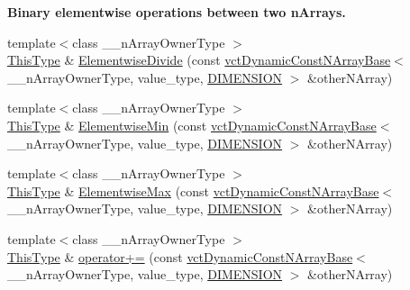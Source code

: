 \begin{Indent}{\bf Binary elementwise operations between two n\-Arrays.}
\begin{DoxyCompactItemize}
\item 
{\footnotesize template$<$class \-\_\-\-\_\-n\-Array\-Owner\-Type $>$ }\\\hyperlink{classvct_dynamic_const_n_array_base_a5123caffcf1455a1b99003877eade897}{This\-Type} \& \hyperlink{classvct_dynamic_n_array_base_ad8c7aae1f9f3e6a062e83219d1878f8f}{Elementwise\-Divide} (const \hyperlink{classvct_dynamic_const_n_array_base}{vct\-Dynamic\-Const\-N\-Array\-Base}$<$ \-\_\-\-\_\-n\-Array\-Owner\-Type, value\-\_\-type, \hyperlink{classvct_dynamic_n_array_base_aa66532d28588bdf26d08fb593db815d6abfcde386ec801b212d7c42d63a4f3837}{D\-I\-M\-E\-N\-S\-I\-O\-N} $>$ \&other\-N\-Array)
\item 
{\footnotesize template$<$class \-\_\-\-\_\-n\-Array\-Owner\-Type $>$ }\\\hyperlink{classvct_dynamic_const_n_array_base_a5123caffcf1455a1b99003877eade897}{This\-Type} \& \hyperlink{classvct_dynamic_n_array_base_a85e6f5675786bb1c81768d2d71a779ba}{Elementwise\-Min} (const \hyperlink{classvct_dynamic_const_n_array_base}{vct\-Dynamic\-Const\-N\-Array\-Base}$<$ \-\_\-\-\_\-n\-Array\-Owner\-Type, value\-\_\-type, \hyperlink{classvct_dynamic_n_array_base_aa66532d28588bdf26d08fb593db815d6abfcde386ec801b212d7c42d63a4f3837}{D\-I\-M\-E\-N\-S\-I\-O\-N} $>$ \&other\-N\-Array)
\item 
{\footnotesize template$<$class \-\_\-\-\_\-n\-Array\-Owner\-Type $>$ }\\\hyperlink{classvct_dynamic_const_n_array_base_a5123caffcf1455a1b99003877eade897}{This\-Type} \& \hyperlink{classvct_dynamic_n_array_base_a710b76f005b3bf51fa907cb8040232d3}{Elementwise\-Max} (const \hyperlink{classvct_dynamic_const_n_array_base}{vct\-Dynamic\-Const\-N\-Array\-Base}$<$ \-\_\-\-\_\-n\-Array\-Owner\-Type, value\-\_\-type, \hyperlink{classvct_dynamic_n_array_base_aa66532d28588bdf26d08fb593db815d6abfcde386ec801b212d7c42d63a4f3837}{D\-I\-M\-E\-N\-S\-I\-O\-N} $>$ \&other\-N\-Array)
\item 
{\footnotesize template$<$class \-\_\-\-\_\-n\-Array\-Owner\-Type $>$ }\\\hyperlink{classvct_dynamic_const_n_array_base_a5123caffcf1455a1b99003877eade897}{This\-Type} \& \hyperlink{classvct_dynamic_n_array_base_aa6e7153e2f5ac982c6b50572c79192ad}{operator+=} (const \hyperlink{classvct_dynamic_const_n_array_base}{vct\-Dynamic\-Const\-N\-Array\-Base}$<$ \-\_\-\-\_\-n\-Array\-Owner\-Type, value\-\_\-type, \hyperlink{classvct_dynamic_n_array_base_aa66532d28588bdf26d08fb593db815d6abfcde386ec801b212d7c42d63a4f3837}{D\-I\-M\-E\-N\-S\-I\-O\-N} $>$ \&other\-N\-Array)

\end{DoxyCompactItemize}
\end{Indent}
